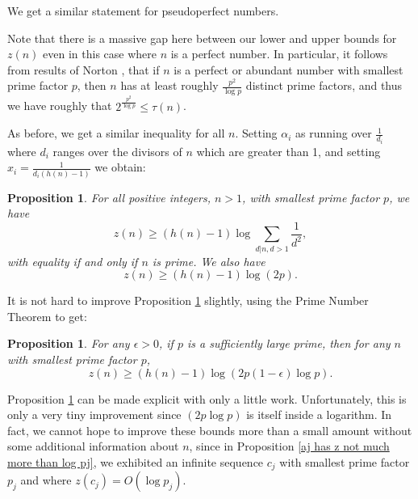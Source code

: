 \documentclass{article}
\newtheorem{proposition}[theorem]{Proposition}
\begin{document}


We get a similar statement for pseudoperfect numbers.

Note that there is a massive gap here between our lower and upper bounds for $z(n)$ even in this case where $n$ is a perfect number.  In particular, it follows from results of Norton \cite{Norton}, that if $n$ is a perfect or abundant number with smallest prime factor $p$, then $n$ has at least roughly $\frac{p^2}{\log p}$ distinct prime factors, and thus we have roughly that  $2^\frac{p^2}{\log p} \leq \tau(n)$. 

As before, we get a similar inequality for all $n$. Setting $\alpha_i$ as running over $\frac{1}{d_i}$ where $d_i$ ranges over the divisors of $n$ which are greater than 1, and setting $x_i = \frac{1}{d_i\left(h(n)-1\right)}$ we obtain:

\begin{proposition} For all positive integers, $n>1$,  with smallest prime factor $p$, we have \label{z(n) general lower bound}
$$z(n) \geq \left(h(n)-1\right) \log \sum_{d|n, d>1} \frac{1}{d^2},$$ with equality if and only if $n$ is prime. We also have
$$z(n) \geq \left(h(n)-1\right) \log (2p).$$
\end{proposition}

It is not hard to improve Proposition \ref{z(n) general lower bound} slightly, using the Prime Number Theorem to get:

\begin{proposition} For any $\epsilon>0$, if $p$ is a sufficiently large prime, then for any $n$ with smallest prime factor $p$, $$z(n) \geq \left(h(n)-1\right) \log (2p (1-\epsilon) \log p).$$ \label{teeny tiny improvement to z lower}
\end{proposition}

Proposition \ref{teeny tiny improvement to z lower} can be made explicit with only a little work. Unfortunately, this is only a very tiny improvement since $(2p\log p)$ is itself inside a logarithm. In fact,
we cannot hope to improve these bounds more than a small amount without some additional information about $n$, since in Proposition \ref{aj has z not much more than log pj}, we exhibited an infinite sequence $c_j$ with smallest prime factor $p_j$ and  where $z(c_j) = O(\log p_j).$
\end{document}

